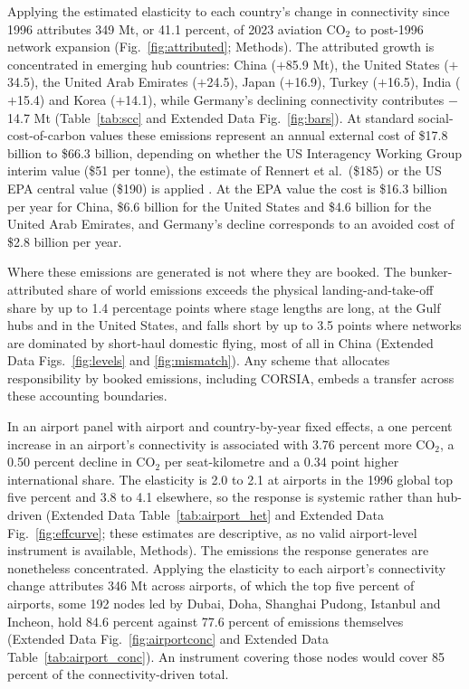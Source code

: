 \documentclass[12pt]{extarticle}
\begin{document}
Applying the estimated elasticity to each country's change in
connectivity since 1996 attributes 349 Mt, or 41.1 percent, of 2023
aviation CO$_2$ to post-1996 network expansion (Fig.~\ref{fig:attributed};
Methods). The attributed growth is concentrated in emerging hub countries:
China ($+$85.9 Mt), the United States ($+$34.5), the United Arab Emirates
($+$24.5), Japan ($+$16.9), Turkey ($+$16.5), India ($+$15.4) and Korea
($+$14.1), while Germany's declining connectivity contributes $-$14.7 Mt
(Table~\ref{tab:scc} and Extended Data Fig.~\ref{fig:bars}). At standard
social-cost-of-carbon values these emissions represent an annual external
cost of \$17.8 billion to \$66.3 billion, depending on whether the US
Interagency Working Group interim value (\$51 per tonne), the estimate of
Rennert et al.\ (\$185) or the US EPA central value (\$190) is applied
\citep{iwg2021,rennert2022,epa2023}. At the EPA value the cost is \$16.3
billion per year for China, \$6.6 billion for the United States and \$4.6
billion for the United Arab Emirates, and Germany's decline corresponds
to an avoided cost of \$2.8 billion per year.

Where these emissions are generated is not where they are booked. The
bunker-attributed share of world emissions exceeds the physical
landing-and-take-off share by up to 1.4 percentage points where stage
lengths are long, at the Gulf hubs and in the United States, and falls
short by up to 3.5 points where networks are dominated by short-haul
domestic flying, most of all in China (Extended Data
Figs.~\ref{fig:levels} and \ref{fig:mismatch}). Any scheme that allocates
responsibility by booked emissions, including CORSIA, embeds a transfer
across these accounting boundaries.

In an airport panel with airport and country-by-year fixed effects, a one
percent increase in an airport's connectivity is associated with 3.76
percent more CO$_2$, a 0.50 percent decline in CO$_2$ per seat-kilometre
and a 0.34 point higher international share. The elasticity is 2.0 to 2.1
at airports in the 1996 global top five percent and 3.8 to 4.1 elsewhere,
so the response is systemic rather than hub-driven (Extended Data
Table~\ref{tab:airport_het} and Extended Data Fig.~\ref{fig:effcurve};
these estimates are descriptive, as no valid airport-level instrument is
available, Methods). The emissions the response generates are nonetheless
concentrated. Applying the elasticity to each airport's connectivity
change attributes 346 Mt across airports, of which the top five percent of
airports, some 192 nodes led by Dubai, Doha, Shanghai Pudong, Istanbul and
Incheon, hold 84.6 percent against 77.6 percent of emissions themselves
(Extended Data Fig.~\ref{fig:airportconc} and Extended Data
Table~\ref{tab:airport_conc}). An instrument covering those nodes would
cover 85 percent of the connectivity-driven total.
\end{document}
